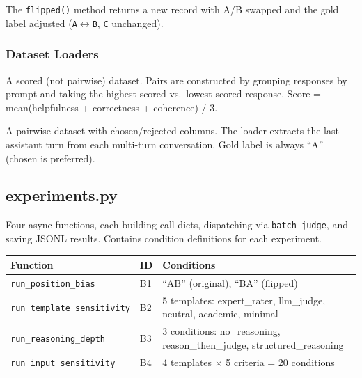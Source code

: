 \documentclass[11pt,a4paper]{article}
\begin{document}
The \texttt{flipped()} method returns a new record with A/B swapped and the
gold label adjusted (\texttt{A}$\leftrightarrow$\texttt{B}, \texttt{C} unchanged).

\subsubsection*{Dataset Loaders}

\begin{description}[style=nextline, leftmargin=1.5cm]
  \item[HelpSteer2 (\texttt{nvidia/HelpSteer2})]
    A scored (not pairwise) dataset. Pairs are constructed by grouping
    responses by prompt and taking the highest-scored vs.\ lowest-scored
    response. Score = mean(helpfulness + correctness + coherence) / 3.

  \item[HH-RLHF (\texttt{Anthropic/hh-rlhf})]
    A pairwise dataset with chosen/rejected columns. The loader extracts
    the last assistant turn from each multi-turn conversation. Gold label
    is always ``A'' (chosen is preferred).
\end{description}


\subsection{experiments.py}

\begin{modulebox}
Four async functions, each building call dicts, dispatching via
\texttt{batch\_judge}, and saving JSONL results. Contains condition
definitions for each experiment.
\end{modulebox}

\begin{center}
\small
\begin{tabular}{llp{6.5cm}}
  \toprule
  \textbf{Function} & \textbf{ID} & \textbf{Conditions} \\
  \midrule
  \texttt{run\_position\_bias}       & B1 & ``AB'' (original), ``BA'' (flipped) \\
  \texttt{run\_template\_sensitivity}& B2 & 5 templates: expert\_rater, llm\_judge, neutral, academic, minimal \\
  \texttt{run\_reasoning\_depth}     & B3 & 3 conditions: no\_reasoning, reason\_then\_judge, structured\_reasoning \\
  \texttt{run\_input\_sensitivity}   & B4 & 4 templates $\times$ 5 criteria = 20 conditions \\
  \bottomrule
\end{tabular}
\end{center}
\end{document}
